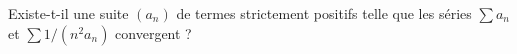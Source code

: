 Existe-t-il une suite $(a_n)$ de termes strictement positifs telle que les séries $\sum a_n$ et $\sum 1/(n^2a_n)$ convergent ?
